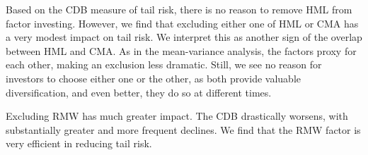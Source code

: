 Based on the CDB measure of tail risk, there is no reason to remove HML from factor investing. However, we find that excluding either one of HML or CMA has a very modest impact on tail risk. We interpret this as another sign of the overlap between HML and CMA. As in the mean-variance analysis, the factors proxy for each other, making an exclusion less dramatic. Still, we see no reason for investors to choose either one or the other, as both provide valuable diversification, and even better, they do so at different times.

Excluding RMW has much greater impact. The CDB drastically worsens, with substantially greater and more frequent declines. We find that the RMW factor is very efficient in reducing tail risk.
 
